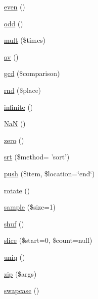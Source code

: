 \begin{DoxyCompactItemize}
\hyperlink{class_pierce_moore_1_1_ruby_p_h_p_1_1r_a046b5f5e8b171d4724f2780303239825}{even} ()
\item 
\hyperlink{class_pierce_moore_1_1_ruby_p_h_p_1_1r_a666c4ea82d473f0e68ad97e3f33d1e83}{odd} ()
\item 
\hyperlink{class_pierce_moore_1_1_ruby_p_h_p_1_1r_a57202f5e3d5e0a89e18aac7d96773cab}{mult} (\$times)
\item 
\hyperlink{class_pierce_moore_1_1_ruby_p_h_p_1_1r_ad8c557c876471daa5dce718f01fd77b2}{av} ()
\item 
\hyperlink{class_pierce_moore_1_1_ruby_p_h_p_1_1r_a0a13d13bfe0866bab479a700d059898b}{gcd} (\$comparison)
\item 
\hyperlink{class_pierce_moore_1_1_ruby_p_h_p_1_1r_ab7cf083b6111db8f56b7d0b42cbba7a0}{rnd} (\$place)
\item 
\hyperlink{class_pierce_moore_1_1_ruby_p_h_p_1_1r_a63f86e65e715320e6e292251810cd0b9}{infinite} ()
\item 
\hyperlink{class_pierce_moore_1_1_ruby_p_h_p_1_1r_ae27ea99fd73ded7a863a154be23756d3}{Na\-N} ()
\item 
\hyperlink{class_pierce_moore_1_1_ruby_p_h_p_1_1r_a75525252dfe9a4b2cc4e31bf066afe1c}{zero} ()
\item 
\hyperlink{class_pierce_moore_1_1_ruby_p_h_p_1_1r_a977f683ea39406f1243565b0ee28bd5a}{srt} (\$method= 'sort')
\item 
\hyperlink{class_pierce_moore_1_1_ruby_p_h_p_1_1r_a24a0a2d08214aa208efaf13be12b41fe}{push} (\$item, \$location=\char`\"{}end\char`\"{})
\item 
\hyperlink{class_pierce_moore_1_1_ruby_p_h_p_1_1r_a74e94d71195d9cbb9c9e3bca3353d912}{rotate} ()
\item 
\hyperlink{class_pierce_moore_1_1_ruby_p_h_p_1_1r_ace98c3b631ca27cdb027bbe389ef8628}{sample} (\$size=1)
\item 
\hyperlink{class_pierce_moore_1_1_ruby_p_h_p_1_1r_a6595f5d5f838d64df0210138f2cef0bd}{shuf} ()
\item 
\hyperlink{class_pierce_moore_1_1_ruby_p_h_p_1_1r_ae01473d9a4d7f2c33c1a157b9cce13f4}{slice} (\$start=0, \$count=null)
\item 
\hyperlink{class_pierce_moore_1_1_ruby_p_h_p_1_1r_a032c9d1b1b6ac32627b95225479aa7c0}{uniq} ()
\item 
\hyperlink{class_pierce_moore_1_1_ruby_p_h_p_1_1r_a2dba4fd3850e2c373dad4604d170dfa6}{zip} (\$args)
\item 
\hyperlink{class_pierce_moore_1_1_ruby_p_h_p_1_1r_a04980c8e9024c09c700fdf68df9d5775}{swapcase} ()

\end{DoxyCompactItemize}
